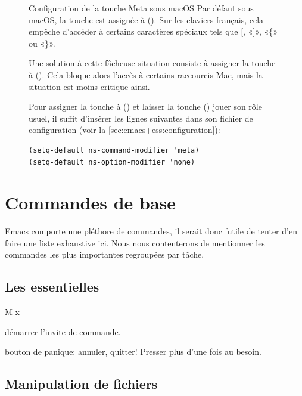 \begin{figure}[t]
  \label{fig:ess:meta}
  \begin{titled-frame}{Configuration de la touche Meta sous macOS}
    Par défaut sous macOS, la touche  est assignée à
     (\optkey). Sur les claviers français, cela empêche
    d'accéder à certains caractères spéciaux tels que {\og}[{\fg},
    «]», «\{» ou «\}».

    Une solution à cette fâcheuse situation consiste à assigner
    la touche  à  (\cmdkey). Cela bloque
    alors l'accès à certains raccourcis Mac, mais la situation est
    moins critique ainsi.

    Pour assigner la touche  à  (\cmdkey) et
    laisser la touche  (\optkey) jouer son rôle usuel, il
    suffit d'insérer les lignes suivantes dans son fichier de
    configuration  (voir la
    \autoref{sec:emacs+ess:configuration}):
\begin{verbatim}
(setq-default ns-command-modifier 'meta)
(setq-default ns-option-modifier 'none)
\end{verbatim}
  \end{titled-frame}
\end{figure}



\section{Commandes de base}
\label{sec:emacs+ess:commandes}

Emacs comporte une pléthore de commandes, il serait donc futile de
tenter d'en faire une liste exhaustive ici. Nous nous contenterons de
mentionner les commandes les plus importantes regroupées par tâche.

\subsection{Les essentielles}
\label{sec:emacs+ess:commandes:essentielles}

\begin{ttscript}{M-x}
\item[\code{M-x}] démarrer l'invite de commande.
\item[\code{C-g}] bouton de panique: annuler, quitter! Presser plus
  d'une fois au besoin.
\end{ttscript}

\subsection{Manipulation de fichiers}
\label{sec:emacs+ess:commandes:fichiers}

